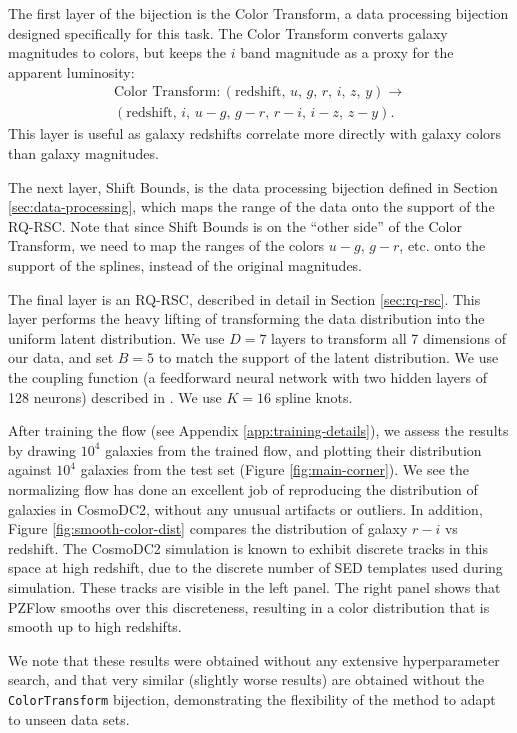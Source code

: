 \documentclass[twocolumn,twocolappendix]{aastex631}
\begin{document}
The first layer of the bijection is the Color Transform, a data processing bijection designed specifically for this task.
The Color Transform converts galaxy magnitudes to colors, but keeps the $i$ band magnitude as a proxy for the apparent luminosity:
\begin{multline}
    \text{Color Transform} : (\text{redshift},\, u,\, g,\, r,\, i,\, z,\, y) \to \\
    (\text{redshift},\, i,\, u-g,\, g-r,\, r-i,\, i-z,\, z-y).
\end{multline}
This layer is useful as galaxy redshifts correlate more directly with galaxy colors than galaxy magnitudes.

The next layer, Shift Bounds, is the data processing bijection defined in Section \ref{sec:data-processing}, which maps the range of the data onto the support of the RQ-RSC.
Note that since Shift Bounds is on the ``other side'' of the Color Transform, we need to map the ranges of the colors $u-g$, $g-r$, etc. onto the support of the splines, instead of the original magnitudes.

The final layer is an RQ-RSC, described in detail in Section \ref{sec:rq-rsc}.
This layer performs the heavy lifting of transforming the data distribution into the uniform latent distribution.
We use $D=7$ layers to transform all 7 dimensions of our data, and set $B=5$ to match the support of the latent distribution.
We use the coupling function (a feedforward neural network with two hidden layers of 128 neurons) described in \citet{durkan2019}.
We use $K=16$ spline knots.

After training the flow (see Appendix \ref{app:training-details}), we assess the results by drawing $10^4$ galaxies from the trained flow, and plotting their distribution against  $10^4$ galaxies from the test set (Figure \ref{fig:main-corner}).
We see the normalizing flow has done an excellent job of reproducing the distribution of galaxies in CosmoDC2, without any unusual artifacts or outliers.
In addition, Figure \ref{fig:smooth-color-dist} compares the distribution of galaxy $r-i$ vs redshift.
The CosmoDC2 simulation is known to exhibit discrete tracks in this space at high redshift, due to the discrete number of SED templates used during simulation.
These tracks are visible in the left panel.
The right panel shows that PZFlow smooths over this discreteness, resulting in a color distribution that is smooth up to high redshifts.

We note that these results were obtained without any extensive hyperparameter search, and that very similar (slightly worse results) are obtained without the \texttt{ColorTransform} bijection, demonstrating the flexibility of the method to adapt to unseen data sets.
\end{document}
